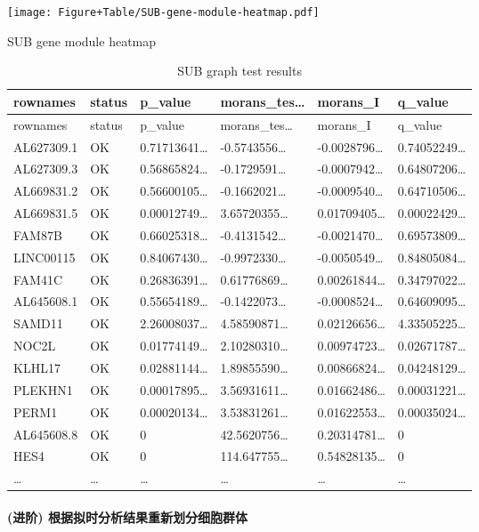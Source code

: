 \documentclass[
]{article}
\begin{document}
\def\@captype{figure}
\begin{center}
\texttt{[image: Figure+Table/SUB-gene-module-heatmap.pdf]}
\caption{SUB gene module heatmap}\label{fig:SUB-gene-module-heatmap}
\end{center}

\begin{longtable}[]{@{}llllll@{}}
\caption{\label{tab:SUB-graph-test-results}SUB graph test results}\tabularnewline
\toprule
rownames & status & p\_value & morans\_tes\ldots{} & morans\_I & q\_value\tabularnewline
\midrule
\endfirsthead
\toprule
rownames & status & p\_value & morans\_tes\ldots{} & morans\_I & q\_value\tabularnewline
\midrule
\endhead
AL627309.1 & OK & 0.71713641\ldots{} & -0.5743556\ldots{} & -0.0028796\ldots{} & 0.74052249\ldots{}\tabularnewline
AL627309.3 & OK & 0.56865824\ldots{} & -0.1729591\ldots{} & -0.0007942\ldots{} & 0.64807206\ldots{}\tabularnewline
AL669831.2 & OK & 0.56600105\ldots{} & -0.1662021\ldots{} & -0.0009540\ldots{} & 0.64710506\ldots{}\tabularnewline
AL669831.5 & OK & 0.00012749\ldots{} & 3.65720355\ldots{} & 0.01709405\ldots{} & 0.00022429\ldots{}\tabularnewline
FAM87B & OK & 0.66025318\ldots{} & -0.4131542\ldots{} & -0.0021470\ldots{} & 0.69573809\ldots{}\tabularnewline
LINC00115 & OK & 0.84067430\ldots{} & -0.9972330\ldots{} & -0.0050549\ldots{} & 0.84805084\ldots{}\tabularnewline
FAM41C & OK & 0.26836391\ldots{} & 0.61776869\ldots{} & 0.00261844\ldots{} & 0.34797022\ldots{}\tabularnewline
AL645608.1 & OK & 0.55654189\ldots{} & -0.1422073\ldots{} & -0.0008524\ldots{} & 0.64609095\ldots{}\tabularnewline
SAMD11 & OK & 2.26008037\ldots{} & 4.58590871\ldots{} & 0.02126656\ldots{} & 4.33505225\ldots{}\tabularnewline
NOC2L & OK & 0.01774149\ldots{} & 2.10280310\ldots{} & 0.00974723\ldots{} & 0.02671787\ldots{}\tabularnewline
KLHL17 & OK & 0.02881144\ldots{} & 1.89855590\ldots{} & 0.00866824\ldots{} & 0.04248129\ldots{}\tabularnewline
PLEKHN1 & OK & 0.00017895\ldots{} & 3.56931611\ldots{} & 0.01662486\ldots{} & 0.00031221\ldots{}\tabularnewline
PERM1 & OK & 0.00020134\ldots{} & 3.53831261\ldots{} & 0.01622553\ldots{} & 0.00035024\ldots{}\tabularnewline
AL645608.8 & OK & 0 & 42.5620756\ldots{} & 0.20314781\ldots{} & 0\tabularnewline
HES4 & OK & 0 & 114.647755\ldots{} & 0.54828135\ldots{} & 0\tabularnewline
\ldots{} & \ldots{} & \ldots{} & \ldots{} & \ldots{} & \ldots{}\tabularnewline
\bottomrule
\end{longtable}

\hypertarget{ux8fdbux9636-ux6839ux636eux62dfux65f6ux5206ux6790ux7ed3ux679cux91cdux65b0ux5212ux5206ux7ec6ux80deux7fa4ux4f53}{%
\paragraph{(进阶) 根据拟时分析结果重新划分细胞群体}\label{ux8fdbux9636-ux6839ux636eux62dfux65f6ux5206ux6790ux7ed3ux679cux91cdux65b0ux5212ux5206ux7ec6ux80deux7fa4ux4f53}}
\end{document}
